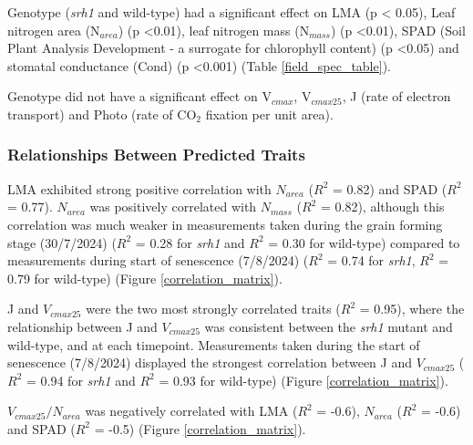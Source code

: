 \documentclass{article}
\begin{document}
Genotype (\textit{srh1} and wild-type) had a significant effect on LMA (p \textless
0.05), Leaf nitrogen area (N$_{area}$) (p \textless 0.01), leaf nitrogen mass (N$_{mass}$)
(p \textless 0.01), SPAD (Soil Plant Analysis Development - a surrogate for chlorophyll
content) (p \textless 0.05) and stomatal conductance (Cond) (p \textless 0.001) (Table \ref{field_spec_table}).

Genotype did not have a significant effect on V$_{cmax}$, V$_{cmax25}$, J (rate
of electron transport) and Photo (rate of CO$_{2}$ fixation per unit area).

\subsubsection{Relationships Between Predicted Traits}

LMA exhibited strong positive correlation with $N_{area}$ ($R^{2}$ = 0.82) and SPAD ($R^{2}$ = 0.77). $N_{area}$ was positively correlated with $N_{mass}$ ($R^{2}$ = 0.82), although this correlation was much weaker in measurements taken during the grain forming stage (30/7/2024) ($R^{2}$ = 0.28 for \textit{srh1} and $R^{2}$ = 0.30 for wild-type) compared to measurements during start of senescence (7/8/2024) ($R^{2}$ = 0.74 for \textit{srh1}, $R^{2}$ = 0.79 for wild-type) (Figure \ref{correlation_matrix}).

J and $V_{cmax25}$ were the two most strongly correlated traits ($R^{2}$ = 0.95), where the relationship between J and $V_{cmax25}$ was consistent between the \textit{srh1} mutant and wild-type, and at each timepoint. Measurements taken during the start of senescence (7/8/2024) displayed the strongest correlation between J and $V_{cmax25}$ ($R^{2}$ = 0.94 for \textit{srh1} and $R^{2}$ = 0.93 for wild-type) (Figure \ref{correlation_matrix}).

$V_{cmax25}/N_{area}$ was negatively correlated with LMA ($R^{2}$ = -0.6), $N_{area}$ ($R^{2}$ = -0.6) and SPAD ($R^{2}$ = -0.5) (Figure \ref{correlation_matrix}).
\end{document}
